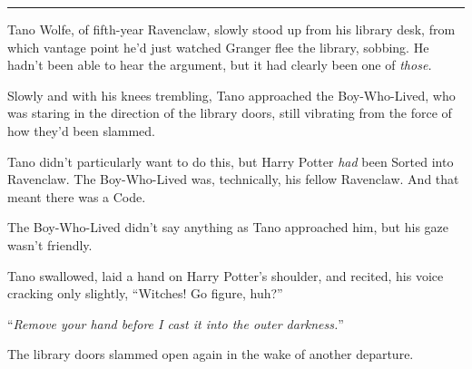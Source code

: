 \begin{center}\rule{3in}{0.4pt}\end{center}

Tano Wolfe, of fifth-year Ravenclaw, slowly stood up from his library desk, from which vantage point he'd just watched Granger flee the library, sobbing. He hadn't been able to hear the argument, but it had clearly been one of \emph{those.}

Slowly and with his knees trembling, Tano approached the Boy-Who-Lived, who was staring in the direction of the library doors, still vibrating from the force of how they'd been slammed.

Tano didn't particularly want to do this, but Harry Potter \emph{had} been Sorted into Ravenclaw. The Boy-Who-Lived was, technically, his fellow Ravenclaw. And that meant there was a Code.

The Boy-Who-Lived didn't say anything as Tano approached him, but his gaze wasn't friendly.

Tano swallowed, laid a hand on Harry Potter's shoulder, and recited, his voice cracking only slightly, ``Witches! Go figure, huh?''

``\emph{Remove your hand before I cast it into the outer darkness.}''

The library doors slammed open again in the wake of another departure.
